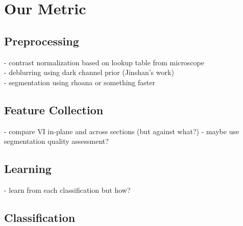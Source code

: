 \documentclass{llncs}
\begin{document}
%
%

\section{Our Metric}

\subsection{Preprocessing}
- contrast normalization based on lookup table from microscope\\
- deblurring using dark channel prior (Jinshan's work)\\
- segmentation using rhoana or something faster

\subsection{Feature Collection}
- compare VI in-plane and across sections (but against what?)
- maybe use segmentation quality assessment?

\subsection{Learning}
- learn from each classification but how?

\subsection{Classification}
\end{document}
